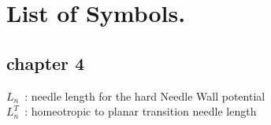 

\chapter{List of Symbols.}
\label{chap:listOfSymb}










\section{chapter 4}

$L_n$~: needle length for the hard Needle Wall potential\\
$L^T_n$~: homeotropic to planar transition needle length\\




